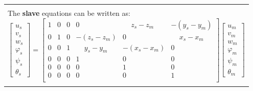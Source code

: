 \documentclass[10pt,b5paper,titlepage]{book}
\newenvironment{bbox}[1][0.96]
{
    \begin{center}
        \begin{tabular}{|p{#1\textwidth}|}
            \hline\\
}
{
            \\\\\hline
        \end{tabular}
    \end{center}
}
\begin{document}
\begin{bbox}[0.95]
    The \textbf{slave} equations can be written as:
    \begin{equation}
        \begin{bmatrix}
            u_s \\
            v_s \\
            w_s \\
            \varphi_s \\
            \psi_s \\
            \theta_s
        \end{bmatrix}
        = \begin{bmatrix}
            1 & 0 & 0 & 0 & \phantom{-(}z_s - z_m & -(y_s - y_m) \\
            0 & 1 & 0 & -(z_s - z_m) & 0 & \phantom{-(}x_s - x_m \\
            0 & 0 & 1 & \phantom{-(}y_s - y_m & -(x_s - x_m) & 0 \\
            0 & 0 & 0 & 1 & 0 & 0 \\
            0 & 0 & 0 & 0 & 1 & 0 \\
            0 & 0 & 0 & 0 & 0 & 1 \\
        \end{bmatrix}
        \begin{bmatrix}
            u_m \\
            v_m \\
            w_m \\
            \varphi_m \\
            \psi_m \\
            \theta_m
        \end{bmatrix}
    \end{equation}


\end{bbox}
\end{document}

